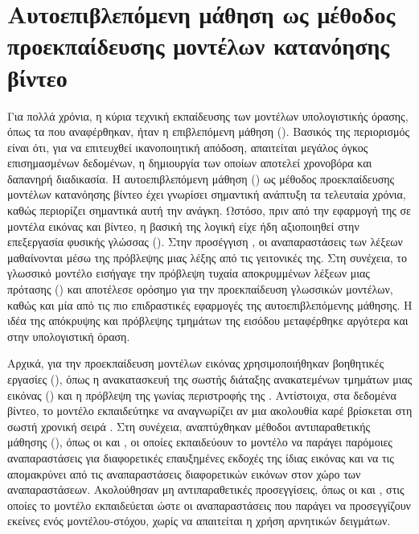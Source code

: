 \section[Αυτοεπιβλεπόμενη προεκπαίδευση μοντέλων βίντεο]
{Αυτοεπιβλεπόμενη μάθηση ως μέθοδος\\
προεκπαίδευσης μοντέλων κατανόησης βίντεο}
\label{sec:related-self-supervised-learning}

Για πολλά χρόνια, η κύρια τεχνική εκπαίδευσης των μοντέλων υπολογιστικής
όρασης, όπως τα  που αναφέρθηκαν, ήταν η επιβλεπόμενη μάθηση
(). Βασικός της περιορισμός είναι ότι, για να
επιτευχθεί ικανοποιητική απόδοση, απαιτείται μεγάλος όγκος επισημασμένων
δεδομένων, η δημιουργία των οποίων αποτελεί χρονοβόρα και δαπανηρή
διαδικασία. Η αυτοεπιβλεπόμενη μάθηση () ως
μέθοδος προεκπαίδευσης μοντέλων κατανόησης βίντεο έχει γνωρίσει
σημαντική ανάπτυξη τα τελευταία χρόνια, καθώς περιορίζει σημαντικά αυτή
την ανάγκη. Ωστόσο, πριν από την εφαρμογή της σε μοντέλα εικόνας
και βίντεο, η βασική της λογική είχε ήδη αξιοποιηθεί στην επεξεργασία
φυσικής γλώσσας (). 
Στην προσέγγιση  \cite{mikolov2013efficient}, οι αναπαραστάσεις
των λέξεων μαθαίνονται μέσω της πρόβλεψης μιας λέξης από τις γειτονικές
της. Στη συνέχεια, το γλωσσικό μοντέλο
 \cite{devlin2018bert} εισήγαγε την πρόβλεψη τυχαία
αποκρυμμένων λέξεων μιας πρότασης () και
αποτέλεσε ορόσημο για την προεκπαίδευση γλωσσικών μοντέλων, καθώς και μία
από τις πιο επιδραστικές εφαρμογές της αυτοεπιβλεπόμενης μάθησης. Η ιδέα
της απόκρυψης και πρόβλεψης τμημάτων της εισόδου μεταφέρθηκε αργότερα
και στην υπολογιστική όραση.

Αρχικά, για την προεκπαίδευση μοντέλων εικόνας χρησιμοποιήθηκαν βοηθητικές
εργασίες (), όπως η ανακατασκευή της σωστής διάταξης
ανακατεμένων τμημάτων μιας εικόνας ()
\cite{noroozi2016unsupervised} και η πρόβλεψη της γωνίας περιστροφής της
\cite{gidaris2018unsupervised}. Αντίστοιχα, στα δεδομένα βίντεο, το
μοντέλο εκπαιδεύτηκε να αναγνωρίζει αν μια ακολουθία καρέ βρίσκεται στη
σωστή χρονική σειρά \cite{misra2016shuffle}. Στη συνέχεια, αναπτύχθηκαν μέθοδοι αντιπαραθετικής μάθησης
(), όπως οι  \cite{he2020momentum} και
 \cite{chen2020simple}, οι οποίες
εκπαιδεύουν το μοντέλο να παράγει παρόμοιες αναπαραστάσεις για
διαφορετικές επαυξημένες εκδοχές της ίδιας εικόνας και να τις απομακρύνει 
από τις αναπαραστάσεις διαφορετικών εικόνων
στον χώρο των αναπαραστάσεων.
Ακολούθησαν μη αντιπαραθετικές προσεγγίσεις, όπως οι 
\cite{grill2020bootstrap} και  \cite{caron2021emerging}, στις οποίες το μοντέλο εκπαιδεύεται
ώστε οι αναπαραστάσεις που παράγει να προσεγγίζουν εκείνες ενός
μοντέλου-στόχου, χωρίς να απαιτείται η χρήση αρνητικών δειγμάτων.

